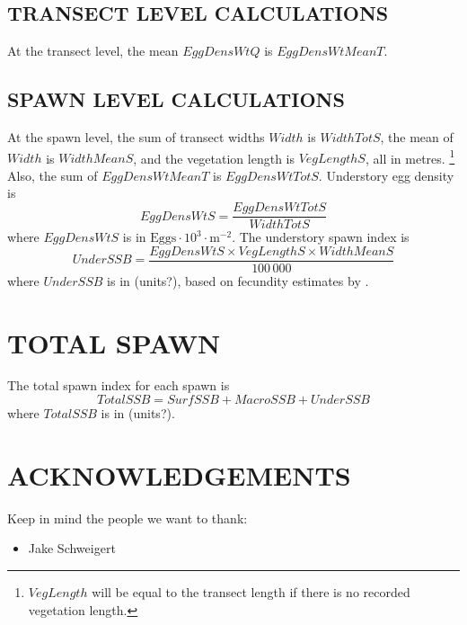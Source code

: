 \documentclass[12pt]{article}
\begin{document}
\subsection{TRANSECT LEVEL CALCULATIONS}

At the transect level, the mean $EggDensWtQ$ is $EggDensWtMeanT$.

\subsection{SPAWN LEVEL CALCULATIONS}

At the spawn level, the sum of transect widths $Width$ is $WidthTotS$, the mean of $Width$ is $WidthMeanS$, and the vegetation length is $VegLengthS$, all in metres.%
\footnote{$VegLength$ will be equal to the transect length if there is no recorded vegetation length.} 
Also, the sum of $EggDensWtMeanT$ is $EggDensWtTotS$.
Understory egg density is 
\begin{equation}
EggDensWtS = \frac{EggDensWtTotS} {WidthTotS}
\label{eqEggDensityUnder}
\end{equation}
where $EggDensWtS$ is in $\text{Eggs} \cdot 10^{3} \cdot \text{m}^{-2}$.
The understory spawn index is
\begin{equation}
UnderSSB = \frac{EggDensWtS \times VegLengthS \times WidthMeanS} {100\,000}
\label{eqBiomassUnder}
\end{equation}
where $UnderSSB$ is in (units?), based on fecundity estimates by \citet{Hay1985}.

\section{TOTAL SPAWN}

The total spawn index for each spawn is
\begin{equation}
TotalSSB = SurfSSB + MacroSSB + UnderSSB
\label{eqTotalSSB}
\end{equation}
where $TotalSSB$ is in (units?).

\section{ACKNOWLEDGEMENTS}

Keep in mind the people we want to thank:
\begin{itemize}
\item Jake Schweigert
\end{itemize}



\end{document}
